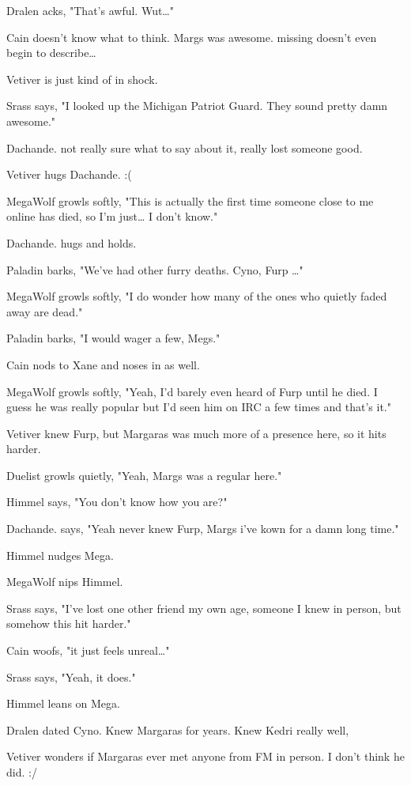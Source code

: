 Dralen acks, "That's awful. Wut\ldots{}"

Cain doesn't know what to think. Margs was awesome. missing doesn't even begin to describe\ldots{}

Vetiver is just kind of in shock.

Srass says, "I looked up the Michigan Patriot Guard.  They sound pretty damn awesome."

Dachande. not really sure what to say about it, really lost someone good.

Vetiver hugs Dachande. :(

MegaWolf growls softly, "This is actually the first time someone close to me online has died, so I'm just\ldots{} I don't know."

Dachande. hugs and holds.

Paladin barks, "We've had other furry deaths. Cyno, Furp \ldots{}"

MegaWolf growls softly, "I do wonder how many of the ones who quietly faded away are dead."

Paladin barks, "I would wager a few, Megs."

Cain nods to Xane and noses in as well.

MegaWolf growls softly, "Yeah, I'd barely even heard of Furp until he died. I guess he was really popular but I'd seen him on IRC a few times and that's it."

Vetiver knew Furp, but Margaras was much more of a presence here, so it hits harder.

Duelist growls quietly, "Yeah, Margs was a regular here."

Himmel says, "You don't know how you are?"

Dachande. says, "Yeah never knew Furp, Margs i've kown for a damn long time."

Himmel nudges Mega.

MegaWolf nips Himmel.

Srass says, "I've lost one other friend my own age, someone I knew in person, but somehow this hit harder."

Cain woofs, "it just feels unreal\ldots{}"

Srass says, "Yeah, it does."

Himmel leans on Mega.

Dralen dated Cyno. Knew Margaras for years. Knew Kedri really well,

Vetiver wonders if Margaras ever met anyone from FM in person. I don't think he did. :/


